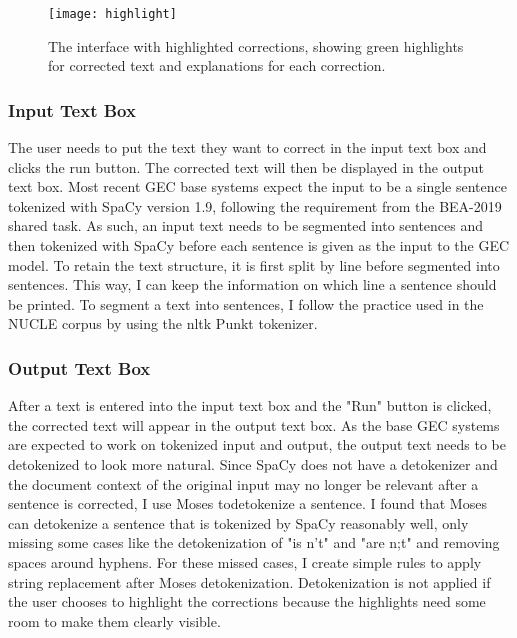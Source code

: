 \begin{figure}[htbp]
  \begin{center}
    \texttt{[image: highlight]}
  \end{center}
  \caption{The interface with highlighted corrections, showing green highlights for corrected text and explanations for each correction.}\label{fig:highlight} \end{figure}

\subsubsection{Input Text Box}

The user needs to put the text they want to correct in the input text box and clicks the run button.
The corrected text will then be displayed in the output text box.
Most recent GEC base systems expect the input to be a single sentence tokenized with SpaCy version 1.9, following the requirement from the BEA-2019 shared task.
As such, an input text needs to be segmented into sentences and then tokenized with SpaCy before each sentence is given as the input to the GEC model.
To retain the text structure, it is first split by line before segmented into sentences.
This way, I can keep the information on which line a sentence should be printed.
To segment a text into sentences, I follow the practice used in the NUCLE corpus by using the nltk Punkt
tokenizer.

\subsubsection{Output Text Box}

After a text is entered into the input text box and the "Run" button is clicked, the corrected text will appear in the output text box.
As the base GEC systems are expected to work on tokenized input and output, the output text needs to be detokenized to look more natural.
Since SpaCy does not have a detokenizer and the document context of the original input may no longer be relevant after a sentence is corrected, I use Moses todetokenize a sentence.
I found that Moses can detokenize a sentence that is tokenized by SpaCy reasonably well, only missing some cases like the detokenization of "is n't" and "are n;t" and removing spaces around hyphens.
For these missed cases, I create simple rules to apply string replacement after Moses detokenization.
Detokenization is not applied if the user chooses to highlight the corrections because the highlights need some room to make them clearly visible.

